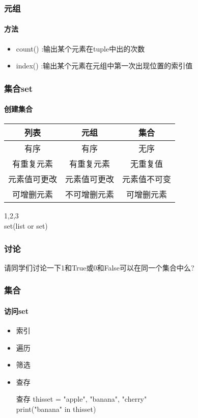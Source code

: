 \documentclass{beamer}
\begin{document}
\begin{frame}[t]
	\frametitle{元组}
	\framesubtitle{方法}
	\begin{itemize}
		\item count() :输出某个元素在tuple中出的次数
		\item index() :输出某个元素在元组中第一次出现位置的索引值
	\end{itemize}

\end{frame}
\begin{frame}[t]
	\frametitle{集合set}
	\framesubtitle{创建集合}
	\begin{table}[htpb]
		\centering
		\label{tab:label}
		\begin{tabular}{|c|c|c|}
			\hline
			列表     & 元组     & 集合     \\
			\hline
			有序     & 有序     & 无序     \\
			\hline
			有重复元素  & 有重复元素  & 无重复值   \\
			\hline
			元素值可更改 & 元素值可更改 & 元素值不可变 \\
			\hline
			可增删元素  & 不可增删元素 & 可增删元素  \\
			\hline
		\end{tabular}
	\end{table}
	\pause
	\begin{example}
		{1,2,3}\\
		set(list or set)
	\end{example}

\end{frame}
\begin{frame}[t]
	\frametitle{讨论}
	请同学们讨论一下1和True或0和False可以在同一个集合中么?

	
\end{frame}
\begin{frame}[t]
	\frametitle{集合}
	\framesubtitle{访问set}
	\begin{itemize}
		\item 索引
		\item 遍历
		\item 筛选
		\item 查存

		      \begin{block}{查存}
			      thisset = {"apple", "banana", "cherry"}\\
			      print("banana" in thisset)
		      \end{block}

	\end{itemize}

\end{frame}
\end{document}
